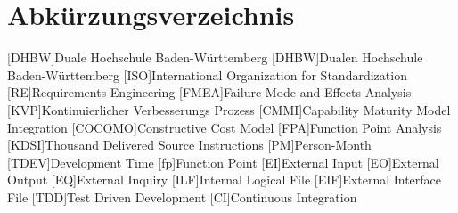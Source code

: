 \section*{Abkürzungsverzeichnis}
\begin{acronym}
  [DHBW]{Duale Hochschule Ba\-den-\-Würt\-tem\-berg}
  [DHBW]{Dualen Hochschule Ba\-den-\-Würt\-tem\-berg}
  [ISO]{International Organization for Standardization}
  [RE]{Requirements Engineering}
  [FMEA]{Failure Mode and Effects Analysis}
  [KVP]{Kontinuierlicher Verbesserungs Prozess}
  [CMMI]{Capability Maturity Model Integration}
  [COCOMO]{Constructive Cost Model}
  [FPA]{Function Point Analysis}
  [KDSI]{Thousand Delivered Source Instructions}
  [PM]{Person-Month}
  [TDEV]{Development Time}
  [fp]{Function Point}
  [EI]{External Input}
  [EO]{External Output}
  [EQ]{External Inquiry}
  [ILF]{Internal Logical File}
  [EIF]{External Interface File}
  [TDD]{Test Driven Development}
  [CI]{Continuous Integration}
\end{acronym}
\newpage